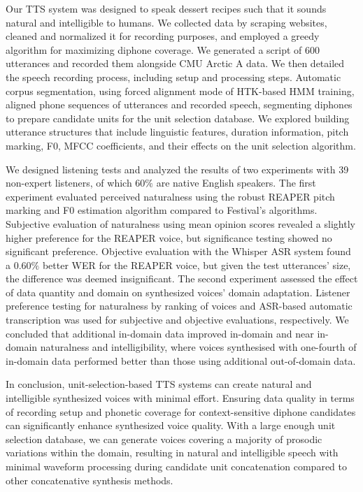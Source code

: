 \documentclass[lettersize,journal]{IEEEtran}
\begin{document}
Our TTS system was designed to speak dessert recipes such that it sounds natural and intelligible to humans. We collected data by scraping websites, cleaned and normalized it for recording purposes, and employed a greedy algorithm for maximizing diphone coverage. We generated a script of 600 utterances and recorded them alongside CMU Arctic A data. We then detailed the speech recording process, including setup and processing steps. Automatic corpus segmentation, using forced alignment mode of HTK-based HMM training, aligned phone sequences of utterances and recorded speech, segmenting diphones to prepare candidate units for the unit selection database. We explored building utterance structures that include linguistic features, duration information, pitch marking, F0, MFCC coefficients, and their effects on the unit selection algorithm.

We designed listening tests and analyzed the results of two experiments with 39 non-expert listeners, of which $60\%$ are native English speakers. The first experiment evaluated perceived naturalness using the robust REAPER pitch marking and F0 estimation algorithm compared to Festival's algorithms. Subjective evaluation of naturalness using mean opinion scores revealed a slightly higher preference for the REAPER voice, but significance testing showed no significant preference. Objective evaluation with the Whisper ASR system found a $0.60\%$ better WER for the REAPER voice, but given the test utterances' size, the difference was deemed insignificant. The second experiment assessed the effect of data quantity and domain on synthesized voices' domain adaptation. Listener preference testing for naturalness by ranking of voices and ASR-based automatic transcription was used for subjective and objective evaluations, respectively. We concluded that additional in-domain data improved in-domain and near in-domain naturalness and intelligibility, where voices synthesised with one-fourth of in-domain data performed better than those using additional out-of-domain data.

In conclusion, unit-selection-based TTS systems can create natural and intelligible synthesized voices with minimal effort. Ensuring data quality in terms of recording setup and phonetic coverage for context-sensitive diphone candidates can significantly enhance synthesized voice quality. With a large enough unit selection database, we can generate voices covering a majority of prosodic variations within the domain, resulting in natural and intelligible speech with minimal waveform processing during candidate unit concatenation compared to other concatenative synthesis methods.
\end{document}
